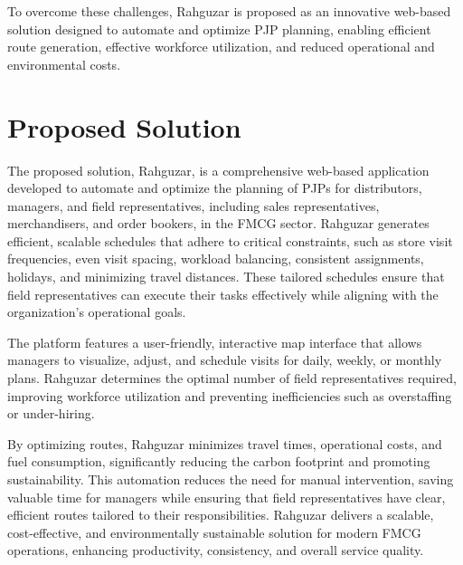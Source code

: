 To overcome these challenges, Rahguzar is proposed as an innovative web-based solution designed to automate and optimize PJP planning, enabling efficient route generation, effective workforce utilization, and reduced operational and environmental costs.
\section{Proposed Solution}


The proposed solution, Rahguzar, is a comprehensive web-based application developed to automate and optimize the planning of PJPs for distributors, managers, and field representatives, including sales representatives, merchandisers, and order bookers, in the FMCG sector. Rahguzar generates efficient, scalable schedules that adhere to critical constraints, such as store visit frequencies, even visit spacing, workload balancing, consistent assignments, holidays, and minimizing travel distances. These tailored schedules ensure that field representatives can execute their tasks effectively while aligning with the organization’s operational goals.

The platform features a user-friendly, interactive map interface that allows managers to visualize, adjust, and schedule visits for daily, weekly, or monthly plans. Rahguzar determines the optimal number of field representatives required, improving workforce utilization and preventing inefficiencies such as overstaffing or under-hiring.

By optimizing routes, Rahguzar minimizes travel times, operational costs, and fuel consumption, significantly reducing the carbon footprint and promoting sustainability. This automation reduces the need for manual intervention, saving valuable time for managers while ensuring that field representatives have clear, efficient routes tailored to their responsibilities. Rahguzar delivers a scalable, cost-effective, and environmentally sustainable solution for modern FMCG operations, enhancing productivity, consistency, and overall service quality.

